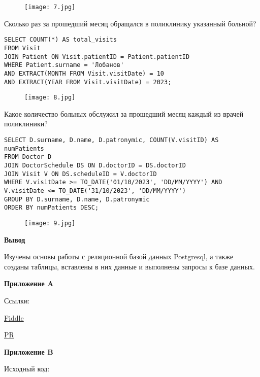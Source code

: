 \documentclass{article}
\begin{document}
\begin{figure}[h]
\centering
\texttt{[image: 7.jpg]}
\label{fig:mpr}
\end{figure}

Сколько раз за прошедший месяц обращался в поликлинику указанный больной?

\begin{verbatim}
SELECT COUNT(*) AS total_visits
FROM Visit
JOIN Patient ON Visit.patientID = Patient.patientID
WHERE Patient.surname = 'Лобанов'
AND EXTRACT(MONTH FROM Visit.visitDate) = 10
AND EXTRACT(YEAR FROM Visit.visitDate) = 2023;
\end{verbatim}

\begin{figure}[h]
\centering
\texttt{[image: 8.jpg]}
\label{fig:mpr}
\end{figure}

Какое количество больных обслужил за прошедший месяц каждый из врачей поликлиники?

\begin{verbatim}
SELECT D.surname, D.name, D.patronymic, COUNT(V.visitID) AS numPatients
FROM Doctor D
JOIN DoctorSchedule DS ON D.doctorID = DS.doctorID
JOIN Visit V ON DS.scheduleID = V.doctorID
WHERE V.visitDate >= TO_DATE('01/10/2023', 'DD/MM/YYYY') AND 
V.visitDate <= TO_DATE('31/10/2023', 'DD/MM/YYYY')
GROUP BY D.surname, D.name, D.patronymic
ORDER BY numPatients DESC;
\end{verbatim}

\begin{figure}[h]
\centering
\texttt{[image: 9.jpg]}
\label{fig:mpr}
\end{figure}

\textbf{Вывод}

Изучены основы работы с реляционной базой данных Postgresql, а также созданы таблицы, вставлены в них данные и выполнены запросы к базе данных.

\newpage

\textbf{Приложение A}

Ссылки:

\href{https://www.db-fiddle.com/f/toVfemvCcHmpdVpWcMDcuL/0}{Fiddle}

\href{https://github.com/moevm/sql-2023-1304/pull/47}{PR}

\textbf{Приложение B}

Исходный код:
\end{document}
